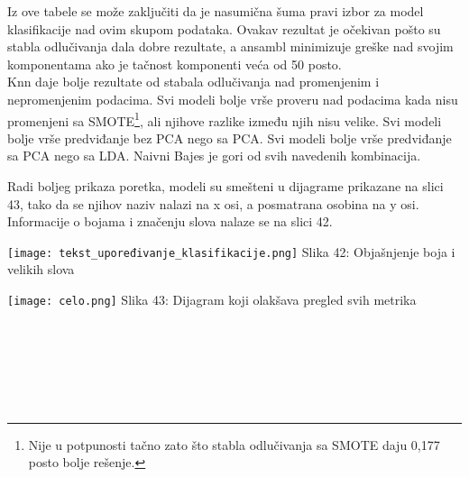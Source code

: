\documentclass[a4paper]{article}
\begin{document}
{Iz ove tabele se može zaključiti da je nasumična šuma pravi izbor za model klasifikacije nad ovim skupom podataka. Ovakav rezultat je očekivan pošto su stabla odlučivanja dala dobre rezultate, a ansambl minimizuje greške nad svojim komponentama ako je tačnost komponenti veća od 50 posto.\\

Knn daje bolje rezultate od stabala odlučivanja nad promenjenim i nepromenjenim podacima. Svi modeli bolje vrše proveru nad podacima kada nisu promenjeni sa SMOTE\footnote[6]{Nije u potpunosti tačno zato što stabla odlučivanja sa SMOTE daju 0,177 posto bolje rešenje.}, ali njihove razlike između njih nisu velike. Svi modeli bolje vrše predviđanje bez PCA nego sa PCA. Svi modeli bolje vrše predviđanje sa PCA nego sa LDA. Naivni Bajes je gori od svih navedenih kombinacija.\\

\noindent\begin{minipage}{0.45\textwidth}
Radi boljeg prikaza poretka, modeli su smešteni u dijagrame prikazane na slici 43, tako da se njihov naziv nalazi na x osi, a posmatrana osobina na y osi. Informacije o bojama i značenju slova nalaze se na slici 42.\\
\end{minipage}
\noindent\begin{minipage}{0.1\textwidth}
\hphantom{a}
\end{minipage}
\noindent\begin{minipage}{0.45\textwidth}
\texttt{[image: tekst\_upoređivanje\_klasifikacije.png]}
Slika 42: Objašnjenje boja i velikih slova\\
\end{minipage}

\noindent\begin{minipage}{1.1\textwidth}
\texttt{[image: celo.png]}
\hphantom{aaaaaaaaaaaaaaaaaaaa}Slika 43: Dijagram koji olakšava pregled svih metrika\\
\end{minipage}

\phantom{a\\}\\
\phantom{a\\}\\
\phantom{a\\}\\
\phantom{a\\}\\
\phantom{a\\}\\

}
\end{document}
